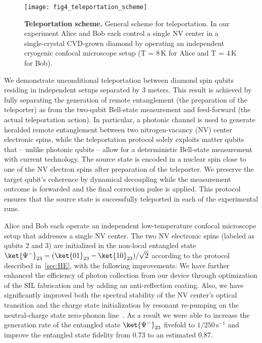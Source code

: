 \begin{figure*}
    \centering
    \texttt{[image: fig4\_teleportation\_scheme]}
    \caption{
    \label{LDE:fig4} 
    \textbf{Teleportation scheme.} 
    General scheme for teleportation. In our experiment Alice and Bob each control a single NV center in a single-crystal CVD-grown diamond by operating an independent cryogenic confocal microscope setup (T = 8\,K for Alice and T  = 4\,K for Bob). 
    }
\end{figure*}

We demonstrate unconditional teleportation between diamond spin qubits residing in independent setups separated by 3 meters. This result is achieved by fully separating the generation of remote entanglement (the preparation of the teleporter) as from the two-qubit Bell-state measurement and feed-forward (the actual teleportation action). In particular, a photonic channel is used to generate heralded remote entanglement between two nitrogen-vacancy (NV) center electronic spins, while the teleportation protocol solely exploits matter qubits that – unlike photonic qubits – allow for a deterministic Bell-state measurement with current technology. The source state is encoded in a nuclear spin close to one of the NV electron spins after preparation of the teleporter. We preserve the target qubit's coherence by dynamical decoupling while the measurement outcome is forwarded and the final correction pulse is applied. This protocol ensures that the source state is successfully teleported in each of the experimental runs.

Alice and Bob each operate an independent low-temperature confocal microscope setup that addresses a single NV center. The two NV electronic spins (labeled as qubits 2 and 3) are initialized in the non-local entangled state $\ket{\Psi^-}_{23} = (\ket{01}_{23} - \ket{10}_{23})/\sqrt2$ according to the protocol described in~\ref{sec:HE}, with the following improvements: We have further enhanced the efficiency of photon collection from our device through optimization of the SIL fabrication and by adding an anti-reflection coating. Also, we have significantly improved both the spectral stability of the NV center's optical transition and the charge state initialization by resonant re-pumping on the neutral-charge state zero-phonon line~\cite{Siyushev_Phys.Rev.Lett._2013}. As a result we were able to increase the generation rate of the entangled state $\ket{\Psi^-}_{23}$ fivefold to $1/250\, \mathrm s^{-1}$ and improve the entangled state fidelity from 0.73 to an estimated 0.87.

